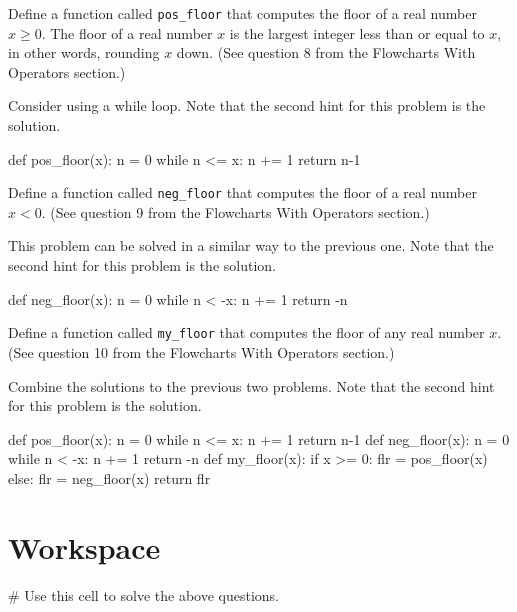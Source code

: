 \documentclass{ximera}
\begin{document}
\begin{question}
	Define a function called \verb|pos_floor| that computes the floor of a real number $x\geq 0$. The floor of a real number $x$ is the largest integer less than or equal to $x$, in other words, rounding $x$ down. (See question 8 from the Flowcharts With Operators section.)
	\begin{hint}
	Consider using a while loop. Note that the second hint for this problem is the solution.
	\end{hint}
	\begin{hint}
\begin{sageCell}
def pos_floor(x):
        n = 0
        while n <= x:
                n += 1
        return n-1
\end{sageCell}
	\end{hint}
\end{question}

\begin{question}
	Define a function called \verb|neg_floor| that computes the floor of a real number $x<0$. (See question 9 from the Flowcharts With Operators section.)
	\begin{hint}
	This problem can be solved in a similar way to the previous one. Note that the second hint for this problem is the solution.
	\end{hint}
	\begin{hint}
\begin{sageCell}
def neg_floor(x):
        n = 0
        while n < -x:
                n += 1
        return -n
\end{sageCell}
	\end{hint}
\end{question}

\begin{question}
	Define a function called \verb|my_floor| that computes the floor of any real number $x$. (See question 10 from the Flowcharts With Operators section.)
	\begin{hint}
	Combine the solutions to the previous two problems. Note that the second hint for this problem is the solution.
	\end{hint}
	\begin{hint}
\begin{sageCell}
def pos_floor(x):
        n = 0
        while n <= x:
                n += 1
        return n-1
def neg_floor(x):
        n = 0
        while n < -x:
                n += 1
        return -n
def my_floor(x):
        if x >= 0:
                flr = pos_floor(x)
        else:
                flr = neg_floor(x)
        return flr
\end{sageCell}
	\end{hint}
\end{question}

\section{Workspace}

\begin{sageCell}
# Use this cell to solve the above questions.
\end{sageCell}
\end{document}
